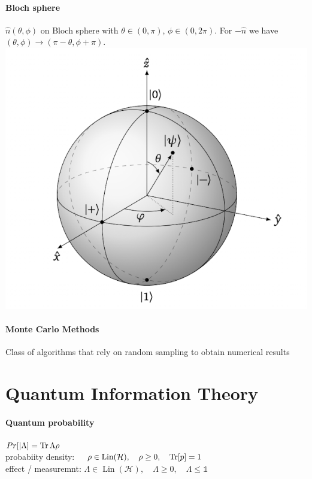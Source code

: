 \paragraph{Bloch sphere}$\hat{n}(\theta, \phi)$ on Bloch sphere with $\theta \in (0, \pi)$, $\phi \in (0,2 \pi)$. 
For $- \hat{n}$ we have $(\theta, \phi) \to (\pi - \theta , \phi + \pi) $.\\
\includegraphics[scale=0.2]{fig/BlochSph.png}

\paragraph{Monte Carlo Methods} Class of algorithms that rely on random sampling to obtain numerical results

\section{Quantum Information Theory}
\paragraph{Quantum probability}
$Pr[|\Lambda] = \Trace{\Lambda \rho} $\\
probabiity density: $\quad \rho \in \operatorname{Lin}(\mathcal{H}), \quad \rho \geq 0, \quad \Trace[p] =1$\\
effect / measuremnt: $\Lambda \in \operatorname{Lin}(\mathcal{H}), \quad \Lambda \geq 0, \quad \Lambda \leq \mathbb{1}$

